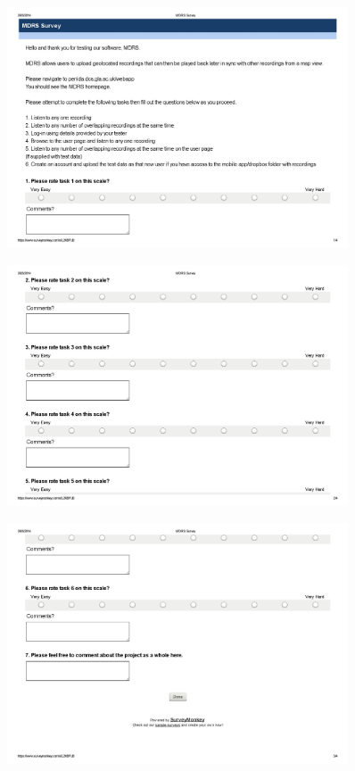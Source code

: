 \documentclass{l3proj}
\begin{document}
\begin{figure}[ht!]
\centering
\includegraphics[angle=270, width=0.9\textwidth]{images/mdrs_survey-page-001.jpg}
\end{figure}

\newpage
\begin{figure}[ht!]
\centering
\includegraphics[angle=270, width=0.9\textwidth]{images/mdrs_survey-page-002.jpg}
\end{figure}

\newpage
\begin{figure}[ht!]
\centering
\includegraphics[angle=270, width=0.9\textwidth]{images/mdrs_survey-page-003.jpg}
\end{figure}
\end{document}

